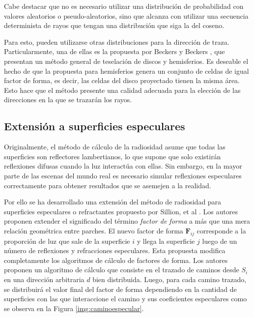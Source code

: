 Cabe destacar que no es necesario utilizar una distribución de probabilidad con valores aleatorios o pseudo-aleatorios, sino que alcanza con utilizar una secuencia determinista de rayos que tengan una distribución que siga la del coseno.

Para esto, pueden utilizarse otras distribuciones para la dirección de traza. Particularmente, una de ellas es la propuesta por Beckers y Beckers \cite{Beckers}, que presentan un método general de teselación de discos y hemisferios. Es deseable el hecho de que la propuesta para hemisferios genera un conjunto de celdas de igual factor de forma, es decir, las celdas del disco proyectado tienen la misma área. Esto hace que el método presente una calidad adecuada para la elección de las direcciones en la que se trazarán los rayos.

\subsection{Extensión a superficies especulares}

Originalmente, el método de cálculo de la radiosidad asume que todas las superficies son reflectores lambertianos, lo que supone que solo existirán reflexiones difusas cuando la luz interactúa con ellas. Sin embargo, en la mayor parte de las escenas del mundo real es necesario simular reflexiones especulares correctamente para obtener resultados que se asemejen a la realidad.

Por ello se ha desarrollado una extensión del método de radiosidad para superficies especulares o refractantes propuesto por Sillion, et al \cite{Sillion}. Los autores proponen extender el significado del término \textit{factor de forma} a más que una mera relación geométrica entre parches. El nuevo factor de forma $\mathbf{F}_{ij}$ corresponde a la proporción de luz que sale de la superficie $i$ y llega la superficie $j$ luego de un número de reflexiones y refracciones especulares. Esta propuesta modifica completamente los algoritmos de cálculo de factores de forma. Los autores proponen un algoritmo de cálculo que consiste en el trazado de caminos desde $S_{i}$ en una dirección arbitraria $d$ bien distribuida.  Luego, para cada camino trazado, se distribuirá el valor final del factor de forma dependiendo en la cantidad de superficies con las que interaccione el camino y sus coeficientes especulares como se observa en la Figura \ref{img:caminoespecular}.

